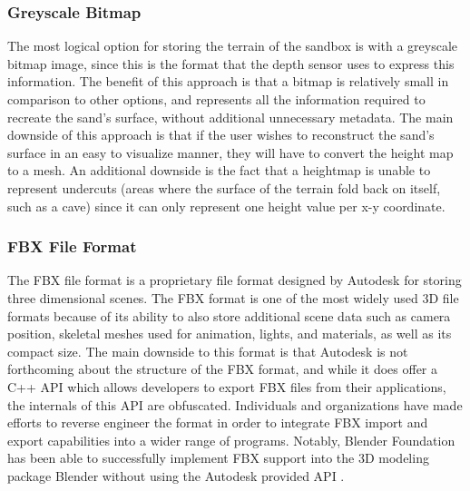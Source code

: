 \subsubsection{Greyscale Bitmap}
The most logical option for storing the terrain of the sandbox is with a greyscale bitmap image, since this is the format that the depth sensor uses to express this information. The benefit of this approach is that a bitmap is relatively small in comparison to other options, and represents all the information required to recreate the sand's surface, without additional unnecessary metadata. The main downside of this approach is that if the user wishes to reconstruct the sand's surface in an easy to visualize manner, they will have to convert the height map to a mesh. An additional downside is the fact that a heightmap is unable to represent undercuts (areas where the surface of the terrain fold back on itself, such as a cave) since it can only represent one height value per x-y coordinate.

\subsubsection{FBX File Format}
The FBX file format is a proprietary file format designed by Autodesk for storing three dimensional scenes. The FBX format is one of the most widely used 3D file formats because of its ability to also store additional scene data such as camera position, skeletal meshes used for animation, lights, and materials, as well as its compact size. The main downside to this format is that Autodesk is not forthcoming about the structure of the FBX format, and while it does offer a C++ API which allows developers to export FBX files from their applications, the internals of this API are obfuscated. Individuals and organizations have made efforts to reverse engineer the format in order to integrate FBX import and export capabilities into a wider range of programs. Notably, Blender Foundation has been able to successfully implement FBX support into the 3D modeling package Blender without using the Autodesk provided API . 

